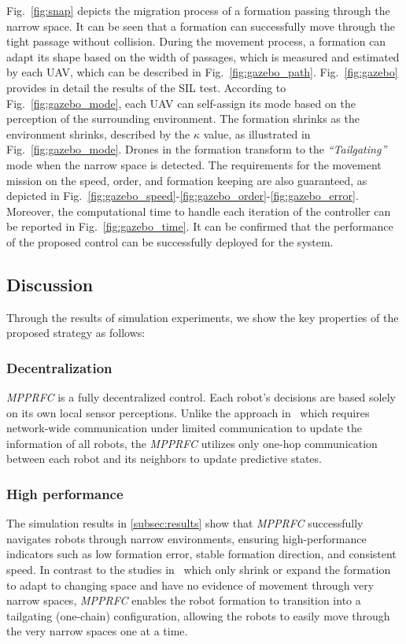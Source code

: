 Fig.~\ref{fig:snap} depicts the migration process of a formation passing through the narrow space. It can be seen that a formation can successfully move through the tight passage without collision. During the movement process, a formation can adapt its shape based on the width of passages, which is measured and estimated by each UAV, which can be described in Fig.~\ref{fig:gazebo_path}. Fig.~\ref{fig:gazebo} provides in detail the results of the SIL test. According to Fig.~\ref{fig:gazebo_mode}, each UAV can self-assign its mode based on the perception of the surrounding environment. The formation shrinks as the environment shrinks, described by the $\kappa$ value, as illustrated in Fig.~\ref{fig:gazebo_mode}. Drones in the formation transform to the \textit{``Tailgating''} mode when the narrow space is detected. The requirements for the movement mission on the speed, order, and formation keeping are also guaranteed, as depicted in Fig.~\ref{fig:gazebo_speed}-\ref{fig:gazebo_order}-\ref{fig:gazebo_error}. Moreover, the computational time to handle each iteration of the controller can be reported in Fig.~\ref{fig:gazebo_time}. It can be confirmed that the performance of the proposed control can be successfully deployed for the system.

\subsection{Discussion}
Through the results of simulation experiments, we show the  key properties of the proposed strategy as follows:

\subsubsection{Decentralization} \textit{MPPRFC} is a fully decentralized control. Each robot's decisions are based solely on its own local sensor perceptions. Unlike the approach in~\cite{AlonsoMora2018} which requires network-wide communication under limited communication to update the information of all robots, the \textit{MPPRFC} utilizes only one-hop communication between each robot and its neighbors to update predictive states.

\subsubsection{High performance}

The simulation results in \ref{subsec:results} show that \textit{MPPRFC} successfully navigates robots through narrow environments, ensuring high-performance indicators such as low formation error, stable formation direction, and consistent speed. In contrast to the studies in~\cite{Elkilany2020,Vsrhelyi2018,Soria2021,AlonsoMora2018} which only shrink or expand the formation to adapt to changing space and have no evidence of movement through very narrow spaces, \textit{MPPRFC} enables the robot formation to transition into a tailgating (one-chain) configuration, allowing the robots to easily move through the very narrow spaces one at a time.

